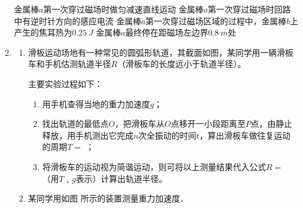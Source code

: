 \begin{enumerate}
\fourchoices
{金属棒$ a $第一次穿过磁场时做匀减速直线运动}
{金属棒$ a $第一次穿过磁场时回路中有逆时针方向的感应电流}
{金属棒$ a $第一次穿过磁场区域的过程中，金属棒$ b $上产生的焦耳热为$ 0.25 \ J $}
{金属棒$ a $最终停在距磁场左边界$ 0.8 \ m $处}




\gaokaosy

\item 
\begin{enumerate}
\item
滑板运动场地有一种常见的圆弧形轨道，其截面如图，某同学用一辆滑板车和手机估测轨道半径$ R $（滑板车的长度远小于轨道半径）。
\begin{figure}[h!]
\centering

\end{figure}



主要实验过程如下： 
\begin{enumerate}
\item
用手机查得当地的重力加速度$ g $； 

\item 
找出轨道的最低点$ O $，把滑板车从$ O $点移开一小段距离至$ P $点，由静止释放，用手机测出它完成$ n $次全振动的时间$ t $，算出滑板车做往复运动的周期$ T= $ \underlinegap ； 

\item 
将滑板车的运动视为简谐运动，则可将以上测量结果代入公式$ R= $ \underlinegap （用$ T $﹑$ g $表示）计算出轨道半径。


\end{enumerate}





\item 
某同学用如图  所示的装置测量重力加速度．
\begin{figure}[h!]
\centering
\begin{subfigure}{0.4\linewidth}
\centering
 
\caption{}\label{2020海南1402a}
\end{subfigure}
\begin{subfigure}{0.4\linewidth}
\centering
 
\caption{}\label{2020海南1402b}
\end{subfigure}

\end{figure}


\end{enumerate}
\end{enumerate}
